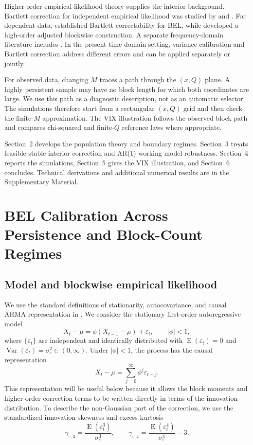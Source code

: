 \documentclass[12pt]{article}
\theoremstyle{remark}
\begin{document}
Higher-order empirical-likelihood theory supplies the interior background. Bartlett correction for independent empirical likelihood was studied by \citet{Hall.LaScala:1990} and \citet{DiCiccio.etal:1991}. For dependent data, \citet{Kitamura:1997} established Bartlett correctability for BEL, while \citet{Wang.Polonik:2019} developed a high-order adjusted blockwise construction. A separate frequency-domain literature includes \citet{Monti:1997,Chan.Liu:2010,Yau:2012,Chan.Chen.Yau:2014,Chen.etal:2016}. In the present time-domain setting, variance calibration and Bartlett correction address different errors and can be applied separately or jointly.

For observed data, changing $M$ traces a path through the $(x,Q)$ plane. A highly persistent sample may have no block length for which both coordinates are large. We use this path as a diagnostic description, not as an automatic selector. The simulations therefore start from a rectangular $(x,Q)$ grid and then check the finite-$M$ approximation. The VIX illustration follows the observed block path and compares chi-squared and finite-$Q$ reference laws where appropriate.

Section~2 develops the population theory and boundary regimes. Section~3 treats feasible stable-interior correction and AR(1) working-model robustness. Section~4 reports the simulations, Section~5 gives the VIX illustration, and Section~6 concludes. Technical derivations and additional numerical results are in the Supplementary Material.

\section{BEL Calibration Across Persistence and Block-Count Regimes}
\label{sec:model-and-calibration}

\subsection{Model and blockwise empirical likelihood}

We use the standard definitions of stationarity, autocovariance, and causal ARMA representation in \citet{Brockwell.Davis:1991}. We consider the stationary first-order autoregressive model
\begin{equation}
X_t-\mu=\phi(X_{t-1}-\mu)+\varepsilon_t,
\qquad |\phi|<1,
\label{eq:ar1}
\end{equation}
where $\{\varepsilon_t\}$ are independent and identically distributed with
$\operatorname{E}(\varepsilon_t)=0$ and
$\operatorname{Var}(\varepsilon_t)=\sigma_\varepsilon^2\in(0,\infty)$.
Under $|\phi|<1$, the process has the causal representation
\[
X_t-\mu=\sum_{j=0}^{\infty}\phi^j\varepsilon_{t-j}.
\]
This representation will be useful below because it allows the block moments
and higher-order correction terms to be written directly in terms of the
innovation distribution. To describe the non-Gaussian part of the correction,
we use the standardized innovation skewness and excess kurtosis
\[
\gamma_{\varepsilon,3}
=
\frac{\operatorname{E}(\varepsilon_t^3)}{\sigma_\varepsilon^3},
\qquad
\gamma_{\varepsilon,4}
=
\frac{\operatorname{E}(\varepsilon_t^4)}{\sigma_\varepsilon^4}-3.
\]
\end{document}

